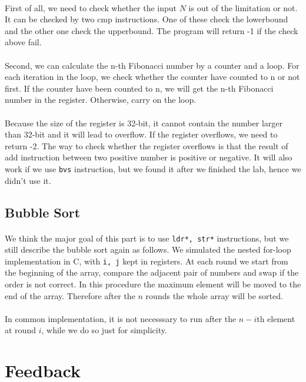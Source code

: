 \paragraph{}
First of all, we need to check whether the input $N$ is out of the limitation or not. It can be checked by two cmp instructions. One of these check the lowerbound and the other one check the upperbound. The program will return -1 if the check above fail.
\paragraph{}
Second, we can calculate the n-th Fibonacci number by a counter and a loop. For each iteration in the loop, we check whether the counter have counted to n or not first. If the counter have been counted to n, we will get the n-th Fibonacci number in the register. Otherwise, carry on the loop.
\paragraph{}
Because the size of the register is 32-bit, it cannot contain the number larger than 32-bit and it will lead to overflow. If the register overflows, we need to return -2. The way to check whether the register overflows is that the result of add instruction between two positive number is positive or negative.
It will also work if we use \texttt{bvs} instruction, but we found it after we finished the lab, hence we didn't use it.


\subsection{Bubble Sort}
\paragraph{}
We think the major goal of this part is to use \texttt{ldr*, str*} instructions, but we still describe the bubble sort again as follows.
We simulated the nested for-loop implementation in C, with \texttt{i, j} kept in registers. At each round we start from the beginning of the array, compare the adjacent pair of numbers and swap if the order is not correct. In this procedure the maximum element will be moved to the end of the array. Therefore after the $n$ rounds the whole array will be sorted.
\paragraph{}
In common implementation, it is not necesssary to run after the $n-i$th element at round $i$, while we do so just for simplicity.
\section{Feedback}
\paragraph{}
